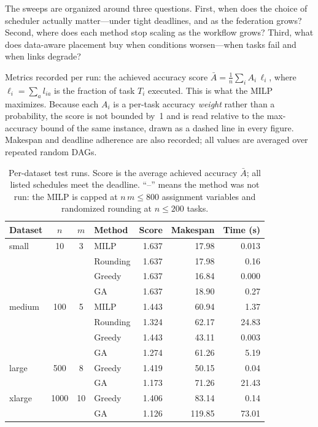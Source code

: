 \documentclass[conference]{IEEEtran}
\begin{document}
The sweeps are organized around three questions. First, when does the choice of scheduler actually matter---under tight deadlines, and as the federation grows? Second, where does each method stop scaling as the workflow grows? Third, what does data-aware placement buy when conditions worsen---when tasks fail and when links degrade?

Metrics recorded per run: the achieved accuracy score $\bar{A}=\frac{1}{n}\sum_i A_i\,\ell_i$, where $\ell_i=\sum_a l_{ia}$ is the fraction of task $T_i$ executed. This is what the MILP maximizes. Because each $A_i$ is a per-task accuracy \emph{weight} rather than a probability, the score is not bounded by~1 and is read relative to the max-accuracy bound of the same instance, drawn as a dashed line in every figure. Makespan and deadline adherence are also recorded; all values are averaged over repeated random DAGs.

\begin{table}[t]
\centering
\caption{Per-dataset test runs. Score is the average achieved accuracy
$\bar{A}$; all listed schedules meet the deadline. ``--'' means the
method was not run: the MILP is capped at $n\,m\le 800$ assignment
variables and randomized rounding at $n\le 200$ tasks.}
\label{tab:runs}
\small
\begin{tabular}{lcclrrr}
\toprule
Dataset & $n$ & $m$ & Method & Score & Makespan & Time (s) \\
\midrule
small  & 10   & 3  & MILP      & 1.637 & 17.98 & 0.013 \\
       &      &    & Rounding  & 1.637 & 17.98 & 0.16  \\
       &      &    & Greedy    & 1.637 & 16.84 & 0.000 \\
       &      &    & GA        & 1.637 & 18.90 & 0.27  \\
\midrule
medium & 100  & 5  & MILP      & 1.443 & 60.94 & 1.37  \\
       &      &    & Rounding  & 1.324 & 62.17 & 24.83 \\
       &      &    & Greedy    & 1.443 & 43.11 & 0.003 \\
       &      &    & GA        & 1.274 & 61.26 & 5.19  \\
\midrule
large  & 500  & 8  & Greedy    & 1.419 & 50.15 & 0.04  \\
       &      &    & GA        & 1.173 & 71.26 & 21.43 \\
\midrule
xlarge & 1000 & 10 & Greedy    & 1.406 & 83.14 & 0.14  \\
       &      &    & GA        & 1.126 & 119.85& 73.01 \\
\bottomrule
\end{tabular}
\end{table}
\end{document}
